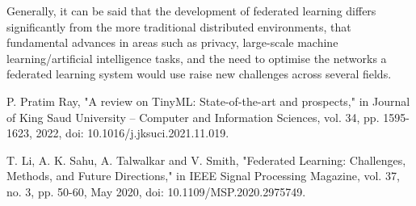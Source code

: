 \documentclass[conference]{IEEEtran}
\begin{document}
Generally, it can be said that the development of federated learning differs significantly from the more traditional distributed environments, that fundamental advances in areas such as privacy, large-scale machine learning/artificial intelligence tasks, and the need to optimise the networks a federated learning system would use raise new challenges across several fields. 

\begin{thebibliography}{00}
 P. Pratim Ray, "A review on TinyML: State-of-the-art and prospects," in Journal of King Saud University –
Computer and Information Sciences, vol. 34, pp. 1595-1623, 2022, doi: 10.1016/j.jksuci.2021.11.019.

 T. Li, A. K. Sahu, A. Talwalkar and V. Smith, "Federated Learning: Challenges, Methods, and Future Directions," in IEEE Signal Processing Magazine, vol. 37, no. 3, pp. 50-60, May 2020, doi: 10.1109/MSP.2020.2975749.
\end{thebibliography}
\vspace{12pt}
\end{document}
